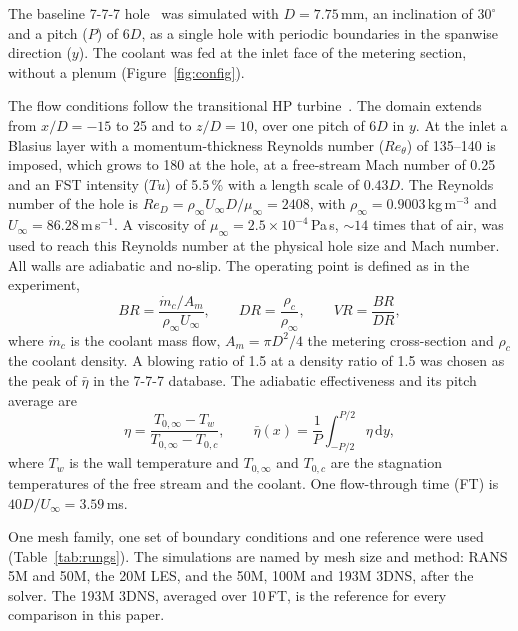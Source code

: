 \documentclass[colorlinks,upint,subscriptcorrection,varvw,hyphenate,balance,lineno]{asmeconf}
\newcommand*{\BR}{\mathit{BR}}
\newcommand*{\DR}{\mathit{DR}}
\newcommand*{\VR}{\mathit{VR}}
\newcommand*{\Reth}{\mathit{Re}_\theta}
\newcommand*{\ReD}{\mathit{Re}_D}
\newcommand*{\Tu}{\mathit{Tu}}
\newcommand*{\etab}{\bar\eta}
\newcommand*{\Uinf}{U_\infty}
\begin{document}
The baseline 7-7-7 hole~\cite{schroeder2014} was simulated with $D=7.75$\,mm, an inclination of $30^\circ$ and a
pitch ($P$) of $6D$, as a single hole with periodic boundaries in the spanwise direction ($y$). The coolant was fed
at the inlet face of the metering section, without a plenum (Figure~\ref{fig:config}).

The flow conditions follow the transitional HP turbine~\cite{clark2024,kar2026}. The domain extends from
$x/D=-15$ to 25 and to $z/D=10$, over one pitch of $6D$ in $y$. At the inlet a Blasius layer with a
momentum-thickness Reynolds number ($\Reth$) of 135--140 is imposed, which grows to 180 at the hole, at a free-stream
Mach number of 0.25 and an FST intensity ($\Tu$) of 5.5\,\% with a length scale of $0.43D$. The Reynolds number of the
hole is $\ReD=\rho_\infty\Uinf D/\mu_\infty=2408$, with $\rho_\infty=0.9003$\,kg\,m$^{-3}$ and
$\Uinf=86.28$\,m\,s$^{-1}$. A viscosity of $\mu_\infty=2.5\times10^{-4}$\,Pa\,s, $\sim14$ times that of air, was
used to reach this Reynolds number at the physical hole size and Mach number. All walls are adiabatic and
no-slip. The operating point is defined as in the experiment,
\begin{equation}\label{eq:br}
\BR=\frac{\dot m_c/A_m}{\rho_\infty\Uinf},\qquad \DR=\frac{\rho_c}{\rho_\infty},\qquad
\VR=\frac{\BR}{\DR},
\end{equation}
where $\dot m_c$ is the coolant mass flow, $A_m=\pi D^2/4$ the metering cross-section and $\rho_c$ the coolant
density. A blowing ratio of 1.5 at a density ratio of 1.5 was chosen as the peak of $\etab$ in the 7-7-7
database. The adiabatic effectiveness and its pitch average are
\begin{equation}\label{eq:eta}
\eta=\frac{T_{0,\infty}-T_w}{T_{0,\infty}-T_{0,c}},\qquad
\etab(x)=\frac{1}{P}\int_{-P/2}^{P/2}\eta\,\mathrm{d}y,
\end{equation}
where $T_w$ is the wall temperature and $T_{0,\infty}$ and $T_{0,c}$ are the stagnation temperatures of the
free stream and the coolant. One flow-through time (FT) is $40D/\Uinf=3.59$\,ms.

One mesh family, one set of boundary conditions and one reference were used (Table~\ref{tab:rungs}). The
simulations are named by mesh size and method: RANS 5M and 50M, the 20M LES, and the 50M, 100M and 193M 3DNS,
after the solver. The 193M 3DNS, averaged over 10\,FT, is the reference for every comparison in this paper.
\end{document}
